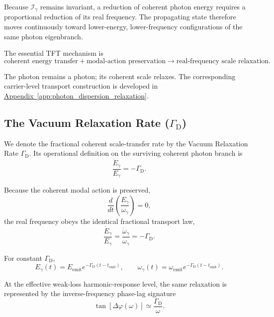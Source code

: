 Because $\mathcal I_\gamma$ remains invariant, a reduction of coherent photon energy requires a proportional reduction of its real frequency. The propagating state therefore moves continuously toward lower-energy, lower-frequency configurations of the same photon eigenbranch.

The essential TFT mechanism is
\begin{equation}
    \text{coherent energy transfer}
    +
    \text{modal-action preservation}
    \longrightarrow
    \text{real-frequency scale relaxation}.
\end{equation}

The photon remains a photon; its coherent scale relaxes. The corresponding carrier-level transport construction is developed in
\hyperref[app:photon_dispersion_relaxation]{Appendix~\ref*{app:photon_dispersion_relaxation}}.

\subsection{The Vacuum Relaxation Rate ($\Gamma_{\mathrm D}$)}

We denote the fractional coherent scale-transfer rate by the Vacuum Relaxation Rate $\Gamma_{\mathrm D}$. Its operational definition on the surviving coherent photon branch is
\begin{equation}
    \frac{\dot E_\gamma}{E_\gamma}
    =
    -\Gamma_{\mathrm D}.
\end{equation}

Because the coherent modal action is preserved,
\begin{equation}
    \frac{d}{dt}
    \left(
        \frac{E_\gamma}{\omega_\gamma}
    \right)
    =
    0,
\end{equation}
the real frequency obeys the identical fractional transport law,
\begin{equation}
    \frac{\dot E_\gamma}{E_\gamma}
    =
    \frac{\dot\omega_\gamma}{\omega_\gamma}
    =
    -\Gamma_{\mathrm D}.
\end{equation}

For constant $\Gamma_{\mathrm D}$,
\begin{equation}
    E_\gamma(t)
    =
    E_{\mathrm{emit}}
    e^{-\Gamma_{\mathrm D}(t-t_{\mathrm{emit}})},
    \qquad
    \omega_\gamma(t)
    =
    \omega_{\mathrm{emit}}
    e^{-\Gamma_{\mathrm D}(t-t_{\mathrm{emit}})}.
\end{equation}

At the effective weak-loss harmonic-response level, the same relaxation is represented by the inverse-frequency phase-lag signature
\begin{equation}
    \tan\!\left[
        \Delta\varphi(\omega)
    \right]
    \simeq
    \frac{\Gamma_{\mathrm D}}{\omega}.
\end{equation}

